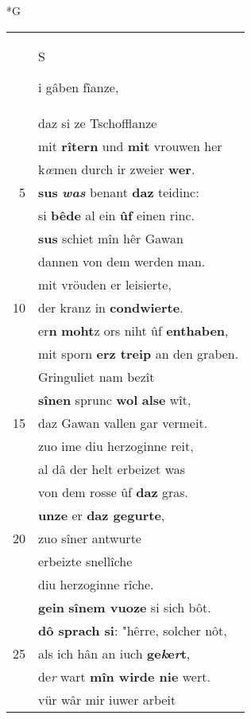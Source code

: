 \documentclass[8pt,a4paper,notitlepage]{article}
\begin{document}
\newpage
\begin{table}[ht]
\begin{minipage}[t]{0.5\linewidth}
\small
\begin{center}*G
\end{center}
\begin{tabular}{rl}
 & \begin{large}S\end{large}i gâben fîanze,\\ 
 & daz si ze Tschofflanze\\ 
 & mit \textbf{rîtern} und \textbf{mit} vrouwen her\\ 
 & k\textit{œ}men durch ir zweier \textbf{wer}.\\ 
5 & \textbf{sus} \textit{\textbf{was}} benant \textbf{daz} teidinc:\\ 
 & si \textbf{bêde} al ein \textbf{ûf} einen rinc.\\ 
 & \textbf{sus} schiet mîn hêr Gawan\\ 
 & dannen von dem werden man.\\ 
 & mit vröuden er leisierte,\\ 
10 & der kranz in \textbf{condwierte}.\\ 
 & er\textbf{n} \textbf{moht}z ors niht ûf \textbf{enthaben},\\ 
 & mit sporn \textbf{erz treip} an den graben.\\ 
 & Gringuliet nam bezît\\ 
 & \textbf{sînen} sprunc \textbf{wol} \textbf{alse} wît,\\ 
15 & daz Gawan vallen gar vermeit.\\ 
 & zuo ime diu herzoginne reit,\\ 
 & al dâ der helt erbeizet was\\ 
 & von dem rosse ûf \textbf{daz} gras.\\ 
 & \textbf{unze} er \textbf{daz gegurte},\\ 
20 & zuo sîner antwurte\\ 
 & erbeizte snellîche\\ 
 & diu herzoginne rîche.\\ 
 & \textbf{gein} \textbf{sînem vuoze} si sich bôt.\\ 
 & \textbf{dô sprach si}: "hêrre, solcher nôt,\\ 
25 & als ich hân an iuch \textbf{ge\textit{k}e\textit{r}t},\\ 
 & de\textit{r} wart \textbf{mîn wirde nie} wert.\\ 
 & vür wâr mir iuwer arbeit\\ 

\end{tabular}
\end{minipage}
\end{table}
\end{document}
